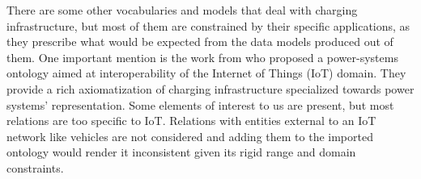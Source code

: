 There are some other vocabularies and models that deal with charging
infrastructure, but most of them are constrained by their specific applications,
as they prescribe what would be expected from the data models produced out of
them. One important mention is the work from \cite{MaximeLefrancois.2017} who
proposed a power-systems ontology aimed at interoperability of the Internet of
Things (IoT) domain. They provide a rich axiomatization of charging
infrastructure specialized towards power systems' representation. Some elements
of interest to us are present, but most relations are too specific to IoT.
Relations with entities external to an IoT network like vehicles are not
considered and adding them to the imported ontology would render it inconsistent
given its rigid range and domain constraints. 
